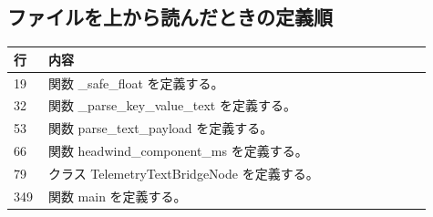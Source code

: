 \documentclass[a4paper,11pt]{article}
\begin{document}
        \subsection{ファイルを上から読んだときの定義順}
            \begin{longtable}{p{0.07\linewidth} p{0.84\linewidth}}
            \toprule
            行 & 内容 \\
            \midrule
            19 & 関数 \_safe\_float を定義する。 \\
32 & 関数 \_parse\_key\_value\_text を定義する。 \\
53 & 関数 parse\_text\_payload を定義する。 \\
66 & 関数 headwind\_component\_ms を定義する。 \\
79 & クラス TelemetryTextBridgeNode を定義する。 \\
349 & 関数 main を定義する。 \\
            \bottomrule
            \end{longtable}
\end{document}
